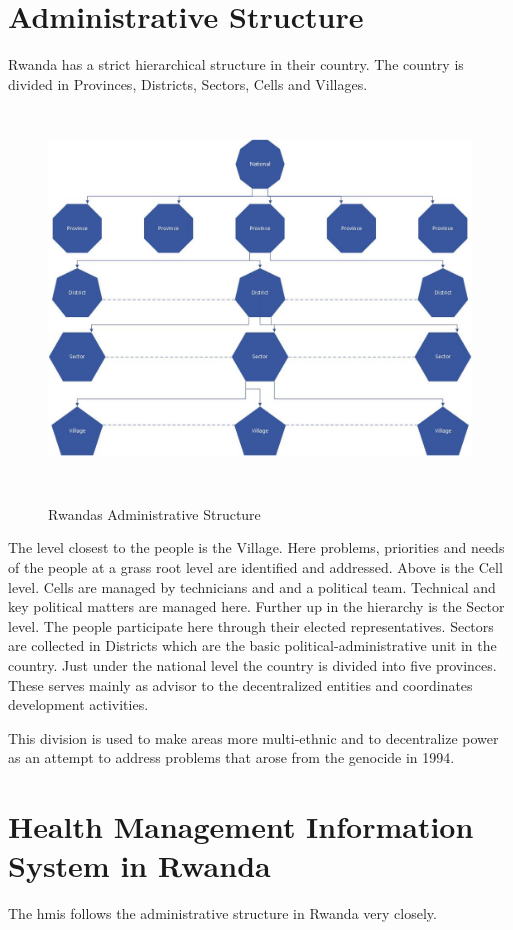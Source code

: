 \section{Administrative Structure}
Rwanda has a strict hierarchical structure in their country. The country is divided in Provinces, Districts, Sectors, Cells and Villages.

\begin{figure}
\centering
\includegraphics[height=10cm]{context/img/rwandaAdminStructure}
\label{rwanda_admin_structure}
\caption{Rwandas Administrative Structure}
\end{figure}

The level closest to the people is the Village. Here problems, priorities and needs of the people at a grass root level are identified and addressed. Above is the Cell level. Cells are managed by technicians and and a political team. Technical and key political matters are managed here. Further up in the hierarchy is the Sector level. The people participate here through their elected representatives. Sectors are collected in Districts which are the basic political-administrative unit in the country. Just under the national level the country is divided into five provinces. These serves mainly as advisor to the decentralized entities and coordinates development activities. \cite{mlg:admin}

This division is used to make areas more multi-ethnic and to decentralize power as an attempt to address problems that arose from the genocide in 1994.

\section{Health Management Information System in Rwanda}
The \gls{hmis} follows the administrative structure in Rwanda very closely.




